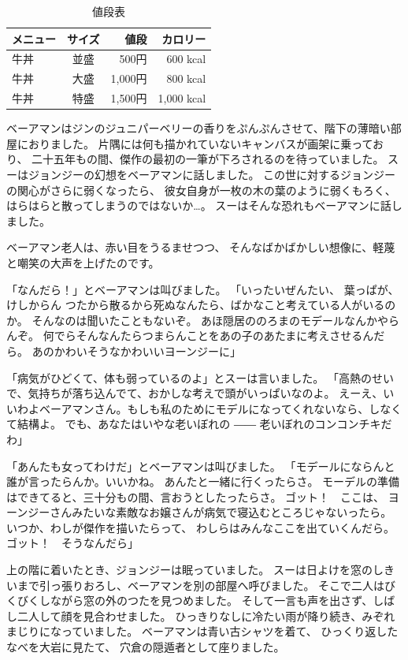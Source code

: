 \begin{table}[htb]
	\begin{center}
	\caption{値段表}
	  \begin{tabular}{|l|c|r||r|} \hline
		 メニュー& サイズ & 値段 & カロリー \\ \hline \hline
			牛丼 & 並盛 & 500円   & 600 kcal \\
			牛丼 & 大盛 & 1,000円 & 800 kcal \\
			牛丼 & 特盛 & 1,500円 & 1,000 kcal \\ \hline
	  \end{tabular}
	\end{center}
\end{table}


ベーアマンはジンのジュニパーベリーの香りをぷんぷんさせて、階下の薄暗い部屋におりました。 片隅には何も描かれていないキャンバスが画架に乗っており、 二十五年もの間、傑作の最初の一筆が下ろされるのを待っていました。 スーはジョンジーの幻想をベーアマンに話しました。 この世に対するジョンジーの関心がさらに弱くなったら、 彼女自身が一枚の木の葉のように弱くもろく、 はらはらと散ってしまうのではないか…。 スーはそんな恐れもベーアマンに話しました。

ベーアマン老人は、赤い目をうるませつつ、 そんなばかばかしい想像に、軽蔑と嘲笑の大声を上げたのです。

「なんだら！」とベーアマンは叫びました。 「いったいぜんたい、 葉っぱが、けしからん つたから散るから死ぬなんたら、ばかなこと考えている人がいるのか。 そんなのは聞いたこともないぞ。 あほ隠居ののろまのモデールなんかやらんぞ。 何でらそんなんたらつまらんことをあの子のあたまに考えさせるんだら。 あのかわいそうなかわいいヨーンジーに」

「病気がひどくて、体も弱っているのよ」とスーは言いました。 「高熱のせいで、気持ちが落ち込んでて、おかしな考えで頭がいっぱいなのよ。 えーえ、いいわよベーアマンさん。もしも私のためにモデルになってくれないなら、しなくて結構よ。 でも、あなたはいやな老いぼれの ―― 老いぼれのコンコンチキだわ」

「あんたも女ってわけだ」とベーアマンは叫びました。 「モデールにならんと誰が言ったらんか。いいかね。 あんたと一緒に行くったらさ。 モーデルの準備はできてると、三十分もの間、言おうとしたったらさ。 ゴット！　ここは、 ヨーンジーさんみたいな素敵なお嬢さんが病気で寝込むところじゃないったら。 いつか、わしが傑作を描いたらって、 わしらはみんなここを出ていくんだら。 ゴット！　そうなんだら」

上の階に着いたとき、ジョンジーは眠っていました。 スーは日よけを窓のしきいまで引っ張りおろし、ベーアマンを別の部屋へ呼びました。 そこで二人はびくびくしながら窓の外のつたを見つめました。 そして一言も声を出さず、しばし二人して顔を見合わせました。 ひっきりなしに冷たい雨が降り続き、みぞれまじりになっていました。 ベーアマンは青い古シャツを着て、 ひっくり返したなべを大岩に見たて、 穴倉の隠遁者として座りました。

